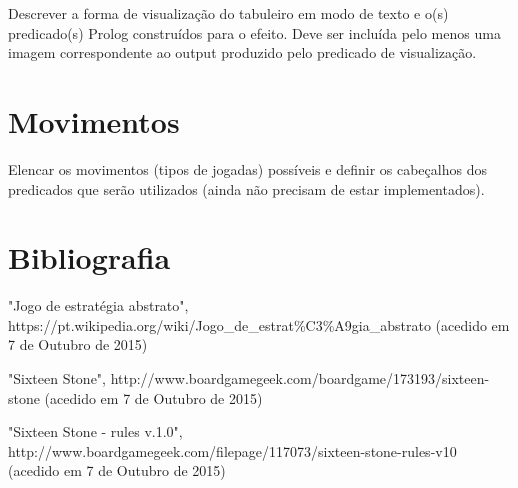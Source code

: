 \documentclass[a4paper]{article}
\begin{document}
Descrever a forma de visualização do tabuleiro em modo de texto e o(s) predicado(s) Prolog construídos para o efeito.
Deve ser incluída pelo menos uma imagem correspondente ao output produzido pelo predicado de visualização.


\section{Movimentos}

Elencar os movimentos (tipos de jogadas) possíveis e definir os cabeçalhos dos predicados que serão utilizados (ainda não precisam de estar implementados).

\newpage

\section*{Bibliografia}

"Jogo de estratégia abstrato", https://pt.wikipedia.org/wiki/Jogo\_de\_estrat\%C3\%A9gia\_abstrato (acedido em 7 de Outubro de 2015) \newline

"Sixteen Stone", http://www.boardgamegeek.com/boardgame/173193/sixteen-stone (acedido em 7 de Outubro de 2015) \newline

"Sixteen Stone - rules v.1.0", http://www.boardgamegeek.com/filepage/117073/sixteen-stone-rules-v10 (acedido em 7 de Outubro de 2015) \newline
\end{document}
